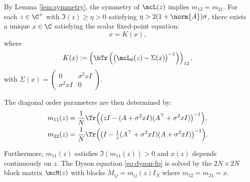 \begin{proposition}\label{prop:fixed-point}
By Lemma \ref{lem:symmetry}, the symmetry of $\mcL(z)$ implies $m_{12} = m_{21}$.
For each $z \in \C^+$ with $\Im(z) \geq \eta > 0$ satisfying $\eta > 2(1 + \norm{A})\sigma$, there exists a unique $x \in \C$ satisfying the scalar fixed-point equation:
\begin{equation}\label{eq:scalar-fp}
x = K(x),
\end{equation}
where
\begin{equation}\label{eq:K-operator}
K(x) := \left(\bTr\left(\bigl(\mcL_0(z) - \Sigma(x)\bigr)^{-1}\right)\right)_{12},
\end{equation}
with $\Sigma(x) = \begin{pmatrix} 0 & \sigma^2 x I \\ \sigma^2 x I & 0 \end{pmatrix}$.

The diagonal order parameters are then determined by:
\begin{align}
m_{11}(z) &= \frac{1}{N}\Tr\Bigl(\bigl(zI - (A + \sigma^2 x I)(A^\top + \sigma^2 x I)\bigr)^{-1}\Bigr), \label{eq:m11-from-x}\\
m_{22}(z) &= \frac{1}{N}\Tr\Bigl(\bigl(I - \tfrac{1}{z}(A^\top + \sigma^2 x I)(A + \sigma^2 x I)\bigr)^{-1}\Bigr). \label{eq:m22-from-x}
\end{align}

Furthermore, $m_{11}(z)$ satisfies $\Im(m_{11}(z)) > 0$ and $x(z)$ depends continuously on $z$. The Dyson equation \eqref{eq:dyson-fp} is solved by the $2N \times 2N$ block matrix $\mcM(z)$ with blocks $M_{ij} = m_{ij}(z) I_N$ where $m_{12} = m_{21} = x$.
\end{proposition}
